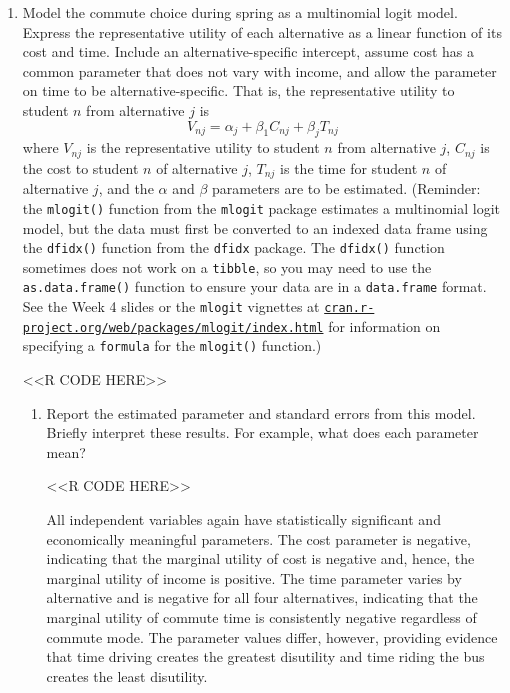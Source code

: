 \documentclass[11pt,letterpaper]{article}
\begin{document}
\begin{enumerate}[label=\alph*., leftmargin=*]
	\item Model the commute choice during spring as a multinomial logit model. Express the representative utility of each alternative as a linear function of its cost and time. Include an alternative-specific intercept, assume cost has a common parameter that does not vary with income, and allow the parameter on time to be alternative-specific. That is, the representative utility to student $n$ from alternative $j$ is
	$$V_{nj} = \alpha_j + \beta_1 C_{nj} + \beta_j T_{nj}$$
	where $V_{nj}$ is the representative utility to student $n$ from alternative $j$, $C_{nj}$ is the cost to student $n$ of alternative $j$, $T_{nj}$ is the time for student $n$ of alternative $j$, and the $\alpha$ and $\beta$ parameters are to be estimated. (Reminder: the \texttt{mlogit()} function from the \texttt{mlogit} package estimates a multinomial logit model, but the data must first be converted to an indexed data frame using the \texttt{dfidx()} function from the \texttt{dfidx} package. The \texttt{dfidx()} function sometimes does not work on a \texttt{tibble}, so you may need to use the \texttt{as.data.frame()} function to ensure your data are in a \texttt{data.frame} format. See the Week 4 slides or the \texttt{mlogit} vignettes at \href{https://cran.r-project.org/web/packages/mlogit/index.html}{\texttt{cran.r-project.org/web/packages/mlogit/index.html}} for information on specifying a \texttt{formula} for the \texttt{mlogit()} function.)

	<<R CODE HERE>>

	\begin{enumerate}[label=\roman*.]
		\item Report the estimated parameter and standard errors from this model. Briefly interpret these results. For example, what does each parameter mean?

		<<R CODE HERE>>

		All independent variables again have statistically significant and economically meaningful parameters. The cost parameter is negative, indicating that the marginal utility of cost is negative and, hence, the marginal utility of income is positive. The time parameter varies by alternative and is negative for all four alternatives, indicating that the marginal utility of commute time is consistently negative regardless of commute mode. The parameter values differ, however, providing evidence that time driving creates the greatest disutility and time riding the bus creates the least disutility.


\end{enumerate}
\end{enumerate}
\end{document}
